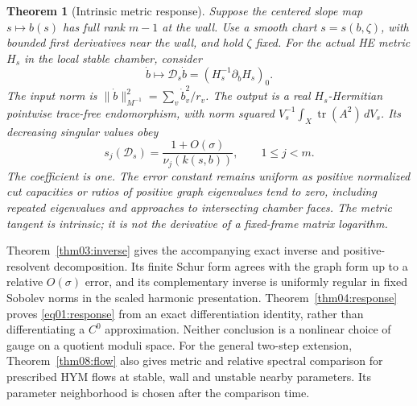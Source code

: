 \documentclass[11pt]{amsart}
\newtheorem{theorem}{Theorem}[section]
\theoremstyle{definition}
\theoremstyle{remark}
\newcommand{\tr}{\operatorname{tr}}
\begin{document}
\begin{theorem}[Intrinsic metric response]\label{thm01:response}
Suppose the centered slope map \(s\mapsto b(s)\) has full rank
\(m-1\) at the wall. Use a smooth chart \(s=s(b,\zeta)\), with
bounded first derivatives near the wall, and hold \(\zeta\) fixed.
For the actual HE metric \(H_s\) in the local stable chamber,
consider
\[
 \dot b\longmapsto\mathscr D_s\dot b
            =(H_s^{-1}\partial_{\dot b}H_s)_0.
\]
The input norm is \(\|\dot b\|_{M^{-1}}^2=\sum_v\dot b_v^2/r_v\).
The output is a real \(H_s\)-Hermitian pointwise trace-free
endomorphism, with norm squared
\(V_s^{-1}\int_X\tr(A^2)\,dV_s\). Its decreasing singular values
obey
\begin{equation}\label{eq01:response}
 s_j(\mathscr D_s)=\frac{1+O(\sigma)}{\nu_j(k(s,b))},
 \qquad 1\le j<m.
\end{equation}
The coefficient is one. The error constant remains uniform as
positive normalized cut capacities or ratios of positive graph
eigenvalues tend to zero, including repeated eigenvalues and
approaches to intersecting chamber faces. The metric tangent is intrinsic;
it is not the derivative of a fixed-frame matrix logarithm.
\end{theorem}

Theorem~\ref{thm03:inverse} gives the accompanying exact inverse and
positive-resolvent decomposition. Its finite Schur form agrees with
the graph form up to a relative \(O(\sigma)\) error, and its
complementary inverse is uniformly regular
in fixed Sobolev norms in the scaled harmonic presentation.
Theorem~\ref{thm04:response} proves \eqref{eq01:response} from an
exact differentiation identity, rather than differentiating a
\(C^0\) approximation. Neither conclusion is a nonlinear choice
of gauge on a quotient moduli space.
For the general two-step extension, Theorem~\ref{thm08:flow} also
gives metric and relative spectral comparison for prescribed HYM
flows at stable, wall and unstable nearby parameters. Its parameter
neighborhood is chosen after the comparison time.
\end{document}
